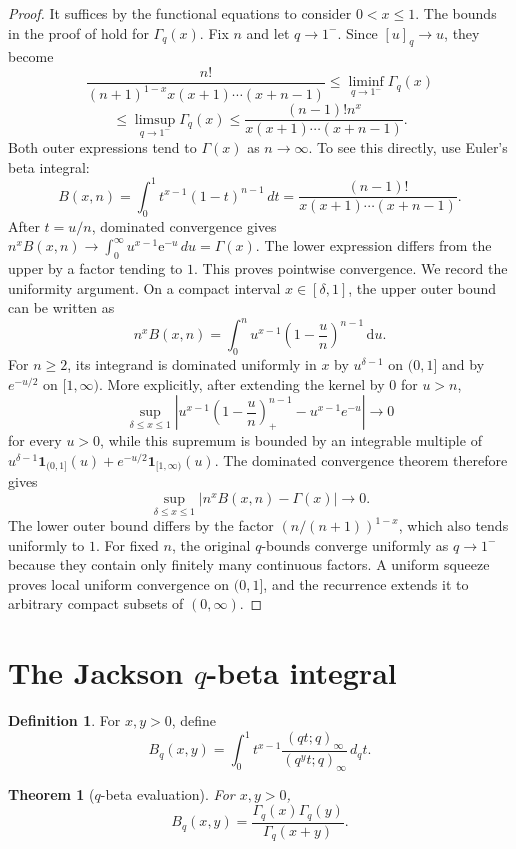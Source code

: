 \documentclass[11pt,oneside,openany]{book}
\newtheorem{theorem}{Theorem}[chapter]
\theoremstyle{definition}
\newtheorem{definition}[definition]{Definition}
\theoremstyle{remark}
\newcommand{\e}{\mathrm e}
\newcommand{\dd}{\,\mathrm d}
\begin{document}
\begin{proof}
It suffices by the functional equations to consider $0<x\le1$.  The bounds in the proof of  hold for $\Gamma_q(x)$.  Fix $n$ and let $q\to1^-$.  Since $[u]_q\to u$, they become
\[
 \frac{n!}{(n+1)^{1-x}x(x+1)\cdots(x+n-1)}
 \le \liminf_{q\to1^-}\Gamma_q(x)
\]
\[
 \le\limsup_{q\to1^-}\Gamma_q(x)
 \le\frac{(n-1)!n^x}{x(x+1)\cdots(x+n-1)}.
\]
Both outer expressions tend to $\Gamma(x)$ as $n\to\infty$.  To see this directly, use Euler's beta integral:
\[
 B(x,n)=\int_0^1t^{x-1}(1-t)^{n-1}\,dt
 =\frac{(n-1)!}{x(x+1)\cdots(x+n-1)}.
\]
After $t=u/n$, dominated convergence gives $n^xB(x,n)\to\int_0^\infty u^{x-1}\e^{-u}\,du=\Gamma(x)$.  The lower expression differs from the upper by a factor tending to $1$.  This proves pointwise convergence.  We record the uniformity argument.  On a compact interval $x\in[\delta,1]$, the upper outer bound can be written as
\[
 n^xB(x,n)=\int_0^n u^{x-1}\left(1-\frac un\right)^{n-1}\dd u.
\]
For $n\ge2$, its integrand is dominated uniformly in $x$ by $u^{\delta-1}$ on $(0,1]$ and by $e^{-u/2}$ on $[1,\infty)$.  More explicitly, after extending the kernel by $0$ for $u>n$,
\[
 \sup_{\delta\le x\le1}
 \left|u^{x-1}\left(1-\frac un\right)_{+}^{n-1}
       -u^{x-1}e^{-u}\right|
 \longrightarrow0
\]
for every $u>0$, while this supremum is bounded by an integrable
multiple of $u^{\delta-1}\mathbf 1_{(0,1]}(u)+e^{-u/2}\mathbf 1_{[1,\infty)}(u)$.
The dominated convergence theorem therefore gives
\[
 \sup_{\delta\le x\le1}
 \left|n^xB(x,n)-\Gamma(x)\right|\longrightarrow0.
\]
The lower outer bound differs by the factor $(n/(n+1))^{1-x}$, which also tends uniformly to $1$.  For fixed $n$, the original $q$-bounds converge uniformly as $q\to1^-$ because they contain only finitely many continuous factors.  A uniform squeeze proves local uniform convergence on $(0,1]$, and the recurrence extends it to arbitrary compact subsets of $(0,\infty)$.
\end{proof}

\section{The Jackson \texorpdfstring{$q$}{q}-beta integral}

\begin{definition}
For $x,y>0$, define
\[
 B_q(x,y)=\int_0^1 t^{x-1}
 \frac{(qt;q)_\infty}{(q^yt;q)_\infty}\,d_qt.
\]
\end{definition}

\begin{theorem}[$q$-beta evaluation]\label{thm:qbeta}
For $x,y>0$,
\[
 B_q(x,y)=\frac{\Gamma_q(x)\Gamma_q(y)}{\Gamma_q(x+y)}.
\]
\end{theorem}
\end{document}
